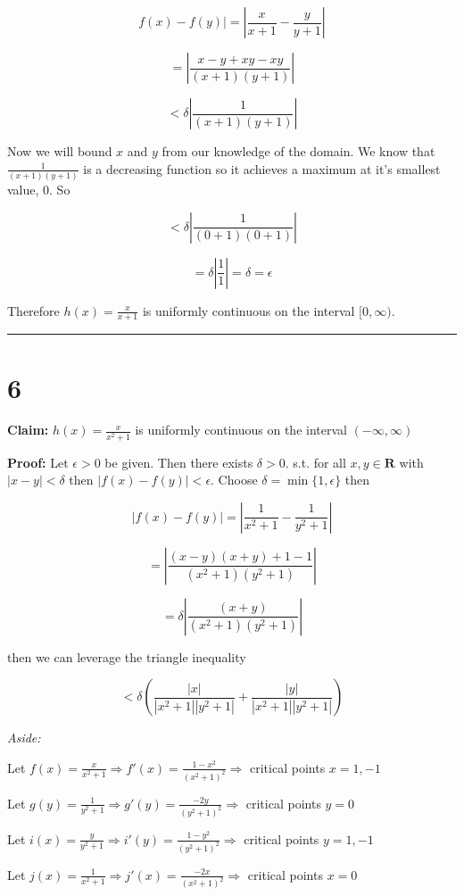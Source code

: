 \documentclass[10pt,letterpaper]{article}
\newcommand\R{\mathbf{R}}
\newcommand\ds{\displaystyle}
\newcommand\qedsym{\hfill \rule{2mm}{2mm}}
\begin{document}
\[f(x)-f(y)| = \left|\frac{x}{x+1}-\frac{y}{y+1}\right|\]

\[= \left|\frac{x-y+xy-xy}{(x+1)(y+1)}\right|\]

\[< \delta\left|\frac{1}{(x+1)(y+1)}\right|\]

Now we will bound $x$ and $y$ from our knowledge of the domain. We know that $\frac{1}{(x+1)(y+1)}$ is a decreasing function so it achieves a maximum at it's smallest value, $0$. So 

\[<\delta\left|\frac{1}{(0+1)(0+1)}\right|\]

\[=\delta\left|\frac{1}{1}\right| = \delta = \epsilon\]

Therefore $h(x) = \frac{x}{x+1}$ is uniformly continuous on the interval $[0, \infty)$.

\qedsym

\section*{6}

\textbf{Claim:} $h(x) = \frac{x}{x^2+1}$ is uniformly continuous on the interval $(-\infty, \infty)$

\medskip

\textbf{Proof:} Let $\epsilon > 0$ be given. Then there exists $\delta > 0$. s.t. for all $x,y\in\R$ with $|x-y|<\delta$ then $|f(x)-f(y)| < \epsilon$. Choose $\delta = \min\{1, \epsilon\}$ then

\[|f(x) - f(y)| = \left|\frac{1}{x^2+1}-\frac{1}{y^2 + 1}\right|\]

\[= \left|\frac{(x-y)(x+y)+1-1}{(x^2+1)(y^2+1)}\right|\]

\[= \delta\left|\frac{(x+y)}{(x^2+1)(y^2+1)}\right|\]

then we can leverage the triangle inequality

\[< \delta\left(\frac{|x|}{|x^2+1||y^2+1|}+\frac{|y|}{|x^2+1||y^2+1|}\right)\]

\textit{Aside:}

Let $\ds f(x) = \frac{x}{x^2+1} \Rightarrow f'(x) = \frac{1-x^2}{(x^2+1)^2}\Rightarrow$ critical points $x=1,-1$

Let $\ds g(y) = \frac{1}{y^2+1} \Rightarrow g'(y) = \frac{-2y}{(y^2+1)^2}\Rightarrow$ critical points $y=0$

Let $\ds i(x) = \frac{y}{y^2+1} \Rightarrow i'(y) = \frac{1-y^2}{(y^2+1)^2}\Rightarrow$ critical points $y=1,-1$

Let $\ds j(x) = \frac{1}{x^2+1} \Rightarrow j'(x) = \frac{-2x}{(x^2+1)^2}\Rightarrow$ critical points $x=0$
\end{document}
